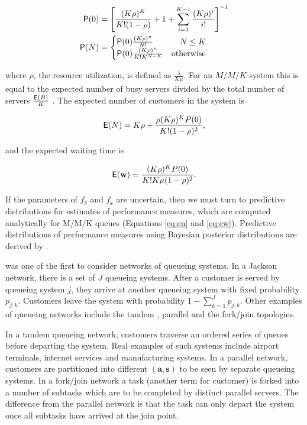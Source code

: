 \documentclass[article]{jss}
\begin{document}
\begin{align}
\mathsf{P}(0) &= \left[\frac{ (K \rho)^K}{K! (1 - \rho)} + 1 + \sum_{i=1}^{K-1} \frac{(K \rho)^i}{i!}   \right]^{-1} \nonumber \\
\mathsf{P}(N) &= \begin{cases} 
\mathsf{P}(0) \frac{(K \rho)^n }{N!} & \quad  N \leq K\\
\mathsf{P}(0) \frac{(K \rho)^n }{K! K^{N-K}} & \text{otherwise} 
\end{cases} \label{eq:pn}
\end{align}

where $\rho$, the resource utilization, is defined as $\frac{\lambda}{K \mu}$. For an $M/M/K$ system this is equal to the expected number of busy servers divided by the total number of servers $\frac{\mathsf{E}(B)}{K}$ \citep[pg. 451]{cassandras2009introduction}. The expected number of customers in the system is \citep{bhat2015introduction}  

\begin{align}
\mathsf{E}(N) = K\rho + \frac{\rho (K\rho)^K P(0)}{K!(1-\rho)^2} \label{eq:en},
\end{align}

and the expected waiting time is

\begin{align}
\mathsf{E}(\mathbf{w}) = \frac{(K \rho)^K P(0)}{K! K \mu(1-\rho)^2} \label{eq:ew}.
\end{align}

If the parameters of $f_\delta$ and $f_{\mathbf{s}}$ are uncertain, then we must turn to predictive distributions for estimates of performance measures, which are computed analytically for M/M/K queues (Equations \ref{eq:en} and \ref{eq:ew}). Predictive distributions of performance measures using Bayesian posterior distributions are derived by \citet{armero1994bayesian, armero1999dealing}.  

\citet{jackson_networks_1957} was one of the first to consider networks of queueing systems. In a Jackson network, there is a set of $J$ queueing systems. After a customer is served by queueing system $j$, they arrive at another queueing system with fixed probability $p_{j,k}$. Customers leave the system with probability $1 - \sum_{k=1}^{J} p_{j,k}$. Other examples of queueing networks include the tandem \citep{glynn_departures_1991}, parallel \citep{hunt_fast_1995} and the fork/join \citep{kim_analysis_1989} topologies. 

In a tandem queueing network, customers traverse an ordered series of queues before departing the system. Real examples of such systems include airport terminals, internet services and manufacturing systems. In a parallel network, customers are partitioned into different $\mathbf{(a,s)}$ to be seen by separate queueing systems. In a fork/join network a task (another term for customer) is forked into a number of subtasks which are to be completed by distinct parallel servers. The difference from the parallel network is that the task can only depart the system once all subtasks have arrived at the join point. 
\end{document}
